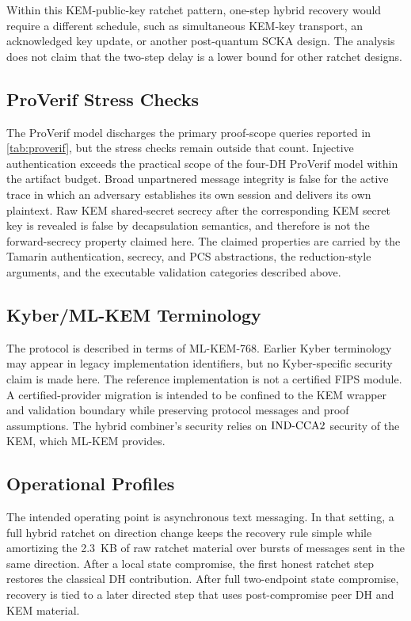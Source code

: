 \documentclass[preprint,12pt]{elsarticle}
\theoremstyle{definition}
\newcommand{\tech}[1]{\textnormal{#1}}
\newcommand{\INDCCA}{\tech{IND-CCA2}}
\begin{document}
Within this KEM-public-key ratchet pattern, one-step hybrid recovery would
require a different schedule, such as simultaneous KEM-key transport, an
acknowledged key update, or another post-quantum SCKA design. The analysis does
not claim that the two-step delay is a lower bound for other ratchet designs.

\subsection{ProVerif Stress Checks}

The ProVerif model discharges the primary proof-scope queries reported in
\cref{tab:proverif}, but the stress checks remain outside that count. Injective
authentication exceeds the practical scope of the four-DH ProVerif model within
the artifact budget. Broad unpartnered message integrity is false for the active
trace in which an adversary establishes its own session and delivers its own
plaintext. Raw KEM shared-secret secrecy after the corresponding KEM secret key
is revealed is false by decapsulation semantics, and therefore is not the
forward-secrecy property claimed here. The claimed properties are carried by the
Tamarin authentication, secrecy, and PCS abstractions, the reduction-style arguments, and
the executable validation categories described above.

\subsection{Kyber/ML-KEM Terminology}

The protocol is described in terms of ML-KEM-768. Earlier Kyber terminology may
appear in legacy implementation identifiers, but no Kyber-specific security
claim is made here. The reference implementation is not a certified FIPS
module. A certified-provider migration is intended to be confined to the KEM
wrapper and validation boundary while preserving protocol messages and proof
assumptions. The hybrid combiner's security relies on $\INDCCA$ security of the
KEM, which ML-KEM provides.

\subsection{Operational Profiles}

The intended operating point is asynchronous text messaging. In that setting,
a full hybrid ratchet on direction change keeps the recovery rule simple while
amortizing the 2.3~KB of raw ratchet material over bursts of messages sent in the same
direction. After a local state compromise, the first honest ratchet step restores
the classical DH contribution. After full two-endpoint state compromise, recovery
is tied to a later directed step that uses post-compromise peer DH and KEM
material.
\end{document}
